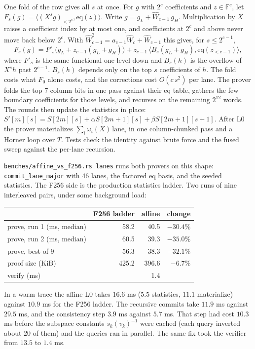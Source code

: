 \documentclass[11pt]{article}
\newcommand{\F}{\mathbb{F}}
\newcommand{\What}{\widehat W}
\begin{document}
One fold of the row gives all $s$ at once. For $g$ with $2^c$
coefficients and $z \in \F^c$, let $F_s(g) = \langle (X^s
g)_{<2^c}, \mathrm{eq}(z)\rangle$. Write $g = g_L + \What_{c-1}\, g_H$.
Multiplication by $X$ raises a coefficient index by at most one, and
coefficients at $2^c$ and above never move back below $2^c$. With
$\What_{c-1}^2 = a_{c-1}\What_c + \What_{c-1}$ this gives, for $s \le
2^{c-1}$,
\[
  F_s(g) = F'_s\bigl(g_L + z_{c-1}(g_L + g_H)\bigr)
  + z_{c-1}\, \langle B_s(g_L + g_H), \mathrm{eq}(z_{<c-1})\rangle,
\]
where $F'_s$ is the same functional one level down and $B_s(h)$ is the
overflow of $X^s h$ past $2^{c-1}$. $B_s(h)$ depends only on the top
$s$ coefficients of $h$. The fold costs what $F_0$ alone costs, and
the corrections cost $O(c\, s^2)$ per lane. The prover folds the top
$7$ column bits in one pass against their eq table, gathers the few
boundary coefficients for those levels, and recurses on the remaining
$2^{12}$ words. The rounds then update the statistics in place:
$S'[m][s] = S[2m][s] + \alpha S[2m+1][s] + \beta S[2m+1][s+1]$. After
L0 the prover materializes $\sum_i \omega_i(X)\,\mathrm{lane}_i$ in
one column-chunked pass and a Horner loop over $T$. Tests check the
identity against brute force and the fused sweep against the per-lane
recursion.

\texttt{benches/affine\_vs\_f256.rs lanes} runs both provers on this
shape: \texttt{commit\_lane\_major} with $46$ lanes, the factored eq
basis, and the seeded statistics. The F256 side is the production
statistics ladder. Two runs of nine interleaved pairs, under some
background load:
\begin{center}
\begin{tabular}{lrrr}
\toprule
& F256 ladder & affine & change \\
\midrule
prove, run 1 (ms, median) & 58.2 & 40.5 & $-30.4\%$ \\
prove, run 2 (ms, median) & 60.5 & 39.3 & $-35.0\%$ \\
prove, best of 9 & 56.3 & 38.3 & $-32.1\%$ \\
proof size (KiB) & 425.2 & 396.6 & $-6.7\%$ \\
verify (ms) & & 1.4 & \\
\bottomrule
\end{tabular}
\end{center}
In a warm trace the affine L0 takes $16.6$ ms ($5.5$ statistics,
$11.1$ materialize) against $10.9$ ms for the F256 ladder. The
recursive commits take $11.9$ ms against $29.5$ ms, and the
consistency step $3.9$ ms against $5.7$ ms. That step had cost
$10.3$ ms before the subspace constants $s_k(v_k)^{-1}$ were cached
(each query inverted about $20$ of them) and the queries ran in
parallel. The same fix took the verifier from $13.5$ to $1.4$ ms.
\end{document}
